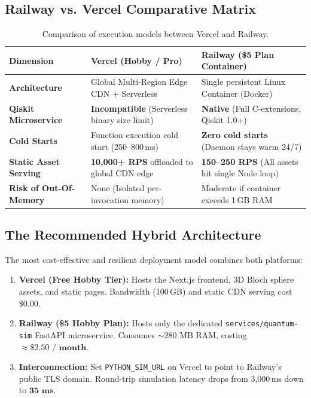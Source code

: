 \documentclass[11pt, a4paper]{article}
\begin{document}
\subsection{Railway vs. Vercel Comparative Matrix}

\begin{table}[h!]
\centering
\small
\begin{tabularx}{\textwidth}{l X X}
\toprule
\textbf{Dimension} & \textbf{Vercel (Hobby / Pro)} & \textbf{Railway (\$5 Plan Container)} \\
\midrule
\textbf{Architecture} & Global Multi-Region Edge CDN + Serverless & Single persistent Linux Container (Docker) \\
\textbf{Qiskit Microservice} & \textcolor{dangerred}{\textbf{Incompatible}} (Serverless binary size limit) & \textcolor{successgreen}{\textbf{Native}} (Full C-extensions, Qiskit 1.0+) \\
\textbf{Cold Starts} & Function execution cold start (250--800\,ms) & \textbf{Zero cold starts} (Daemon stays warm 24/7) \\
\textbf{Static Asset Serving} & \textbf{10,000+ RPS} offloaded to global CDN edge & \textbf{150--250 RPS} (All assets hit single Node loop) \\
\textbf{Risk of Out-Of-Memory} & None (Isolated per-invocation memory) & Moderate if container exceeds 1\,GB RAM \\
\bottomrule
\end{tabularx}
\caption{Comparison of execution models between Vercel and Railway.}
\label{tab:railway_comp}
\end{table}

\subsection{The Recommended Hybrid Architecture}
The most cost-effective and resilient deployment model combines both platforms:
\begin{enumerate}[leftmargin=1.5em]
    \item \textbf{Vercel (Free Hobby Tier):} Hosts the Next.js frontend, 3D Bloch sphere assets, and static pages. Bandwidth (100\,GB) and static CDN serving cost $\mathbf{\$0.00}$.
    \item \textbf{Railway (\$5 Hobby Plan):} Hosts only the dedicated \texttt{services/quantum-sim} FastAPI microservice. Consumes $\sim 280\text{ MB}$ RAM, costing $\approx \mathbf{\$2.50\text{ / month}}$.
    \item \textbf{Interconnection:} Set \texttt{PYTHON\_SIM\_URL} on Vercel to point to Railway's public TLS domain. Round-trip simulation latency drops from 3,000\,ms down to $\mathbf{35\text{ ms}}$.
\end{enumerate}
\end{document}
